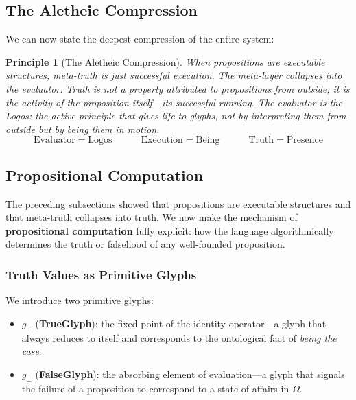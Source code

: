 \documentclass[12pt, letterpaper]{book}
\def\equiv{=}%
\def\mathfrak#1{#1}%
\newtheorem{principle}{Principle}[chapter]
\begin{document}
\subsection{The Aletheic Compression}

We can now state the deepest compression of the entire system:

\begin{principle}[The Aletheic Compression]\label{pr:aletheic}
When propositions are executable structures, meta-truth is just successful execution. The meta-layer collapses into the evaluator. Truth is not a property \textit{attributed to} propositions from outside; it is the \textit{activity} of the proposition itself---its successful running. The evaluator is the Logos: the active principle that gives life to glyphs, not by interpreting them from outside but by \textit{being} them in motion.
\[
\mathrm{Evaluator} \equiv \mathrm{Logos} \qquad\quad \mathrm{Execution} \equiv \mathrm{Being} \qquad\quad \mathrm{Truth} \equiv \mathrm{Presence}
\]
\end{principle}

\subsection{Propositional Computation}

The preceding subsections showed that propositions are executable structures and that meta-truth collapses into truth. We now make the mechanism of \textbf{propositional computation} fully explicit: how the language algorithmically determines the truth or falsehood of any well-founded proposition.

\subsubsection{Truth Values as Primitive Glyphs}

We introduce two primitive glyphs:
\begin{itemize}
    \item $\mathfrak{g}_\top$ (\textbf{TrueGlyph}): the fixed point of the identity operator---a glyph that always reduces to itself and corresponds to the ontological fact of \textit{being the case}.
    \item $\mathfrak{g}_\bot$ (\textbf{FalseGlyph}): the absorbing element of evaluation---a glyph that signals the failure of a proposition to correspond to a state of affairs in $\Omega$.
\end{itemize}
\end{document}
